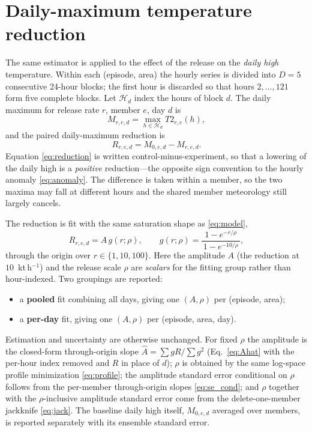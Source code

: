 \documentclass[11pt]{article}
\begin{document}
\section{Daily-maximum temperature reduction}
\label{sec:tmax}

The same estimator is applied to the effect of the release on the \emph{daily
high} temperature. Within each (episode, area) the hourly series is divided into
$D=5$ consecutive 24-hour blocks; the first hour is discarded so that hours
$2,\dots,121$ form five complete blocks. Let $\mathcal{H}_d$ index the hours of
block $d$. The daily maximum for release rate $r$, member $e$, day $d$ is
\begin{equation}
  M_{r,e,d} = \max_{h\in\mathcal{H}_d} T2_{r,e}(h),
\end{equation}
and the paired daily-maximum reduction is
\begin{equation}
  R_{r,e,d} = M_{0,e,d} - M_{r,e,d}.
  \label{eq:reduction}
\end{equation}
Equation \eqref{eq:reduction} is written control-minus-experiment, so that a
lowering of the daily high is a \emph{positive} reduction---the opposite sign
convention to the hourly anomaly \eqref{eq:anomaly}. The difference is taken
within a member, so the two maxima may fall at different hours and the shared
member meteorology still largely cancels.

The reduction is fit with the same saturation shape as \eqref{eq:model},
\begin{equation}
  R_{r,e,d} = A\, g(r;\rho),
  \qquad
  g(r;\rho) = \frac{1 - e^{-r/\rho}}{\,1 - e^{-10/\rho}\,},
  \label{eq:tmax_model}
\end{equation}
through the origin over $r\in\{1,10,100\}$. Here the amplitude $A$ (the reduction
at $10$~kt\,h$^{-1}$) and the release scale $\rho$ are \emph{scalars} for the
fitting group rather than hour-indexed. Two groupings are reported:
\begin{itemize}
  \item a \textbf{pooled} fit combining all days, giving one $(A,\rho)$ per
        (episode, area);
  \item a \textbf{per-day} fit, giving one $(A,\rho)$ per (episode, area, day).
\end{itemize}
Estimation and uncertainty are otherwise unchanged. For fixed $\rho$ the amplitude
is the closed-form through-origin slope $\widehat{A}=\sum g R / \sum g^2$
(Eq.~\eqref{eq:Ahat} with the per-hour index removed and $R$ in place of $d$);
$\rho$ is obtained by the same log-space profile minimization
\eqref{eq:profile}; the amplitude standard error conditional on $\rho$ follows
from the per-member through-origin slopes \eqref{eq:se_cond}; and $\rho$ together
with the $\rho$-inclusive amplitude standard error come from the
delete-one-member jackknife \eqref{eq:jack}. The baseline daily high itself,
$M_{0,e,d}$ averaged over members, is reported separately with its ensemble
standard error.
\end{document}

